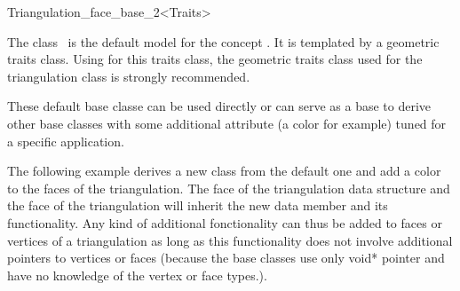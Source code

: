 

\begin{ccRefClass}{Triangulation_face_base_2<Traits>}  %


\ccDefinition
  
The class \ccRefName\ is the default  model for the concept
.
It is  templated by a geometric traits class.
Using for this traits class, the geometric traits class used for the triangulation class
is strongly recommended. 

These default base classe can be used directly or can serve as a base to derive
other base classes with some additional attribute (a color for example)
tuned for a specific application.


\ccIsModel
{}

\ccSeeAlso



\ccExample
The following example derives a new  class from the default
one and add a color to the faces of the triangulation. 
The face of the triangulation data structure
and the face of the triangulation will inherit the new data member 
and its functionality.
Any kind of additional fonctionality can thus be added to faces or vertices of a triangulation 
as long as this functionality  does not involve additional pointers to vertices or faces
(because the base classes use only void* pointer and have no knowledge
of the vertex or face types.).


\end{ccRefClass}


